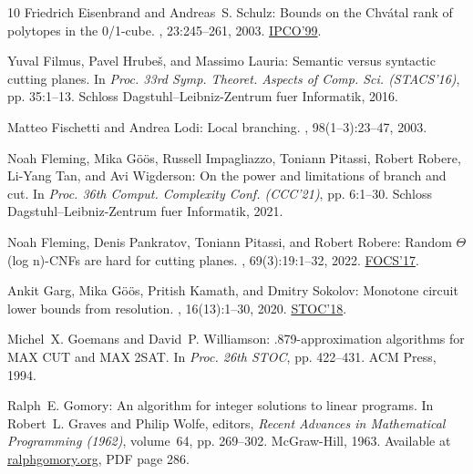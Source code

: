 \begin{thebibliography}{10}
{\sc Friedrich Eisenbrand and Andreas~S. Schulz}: Bounds on the {C}hv{\'{a}}tal
  rank of polytopes in the 0/1-cube.
, 23:245--261, 2003.
\newblock \prelim \href{https://doi.org/10.1007/3-540-48777-8\_11}{IPCO'99}.
\newblock [\epfmtdoi{10.1007/s00493-003-0020-5}]

{\sc Yuval Filmus, Pavel Hrube{\v{s}}, and Massimo Lauria}: Semantic versus
  syntactic cutting planes.
\newblock In {\em Proc. 33rd Symp. Theoret. Aspects of Comp. Sci. (STACS'16)},
  pp. 35:1--13. Schloss Dagstuhl--Leibniz-Zentrum fuer Informatik, 2016.

{\sc Matteo Fischetti and Andrea Lodi}: Local branching.
, 98(1--3):23--47, 2003.
\newblock [\epfmtdoi{10.1007/s10107-003-0395-5}]

{\sc Noah Fleming, Mika G{\"{o}}{\"{o}}s, Russell Impagliazzo, Toniann Pitassi,
  Robert Robere, Li{-}Yang Tan, and Avi Wigderson}: On the power and
  limitations of branch and cut.
\newblock In {\em Proc. 36th Comput. Complexity Conf. (CCC'21)}, pp. 6:1--30.
  Schloss Dagstuhl--Leibniz-Zentrum fuer Informatik, 2021.

{\sc Noah Fleming, Denis Pankratov, Toniann Pitassi, and Robert Robere}: Random
  {\(\Theta\)}(log n)-{CNF}s are hard for cutting planes.
, 69(3):19:1--32, 2022.
\newblock \prelim \href{https://doi.org/10.1109/FOCS.2017.19}{FOCS'17}.
\newblock [\epfmtdoi{10.1145/3486680}]

{\sc Ankit Garg, Mika G{\"{o}}{\"{o}}s, Pritish Kamath, and Dmitry Sokolov}:
  Monotone circuit lower bounds from resolution.
, 16(13):1--30, 2020.
\newblock \prelim \href{https://doi.org/10.1145/3188745.3188838}{STOC'18}.

{\sc Michel~X. Goemans and David~P. Williamson}: .879-approximation algorithms
  for {MAX CUT} and {MAX 2SAT}.
\newblock In {\em Proc. 26th STOC}, pp. 422--431. ACM Press, 1994.
\newblock [\epfmtdoi{10.1145/195058.195216}]

{\sc Ralph~E. Gomory}: An algorithm for integer solutions to linear programs.
\newblock In {\sc Robert~L. Graves and Philip Wolfe}, editors, {\em Recent
  Advances in Mathematical Programming (1962)}, volume~64, pp. 269--302.
  McGraw-Hill, 1963.
\newblock Available at
  \href{https://ralphgomory.org/wp-content/uploads/2023/02/Algorithm\_for\_integer-1.pdf}{ralphgomory.org},
  PDF page 286.


\end{thebibliography}
